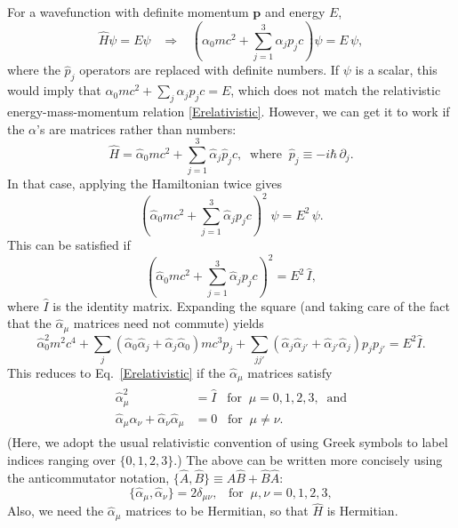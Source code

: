 \documentclass[pra,12pt]{revtex4}
\begin{document}
For a wavefunction with definite momentum $\mathbf{p}$ and energy
$E$,
\begin{equation}
  \hat{H}\psi = E \psi \;\;\;\Rightarrow \;\;\;
  \left(\alpha_0mc^2 + \sum_{j=1}^3\alpha_j p_jc\right) \psi = E\,\psi,
\end{equation}
where the $\hat{p}_j$ operators are replaced with definite numbers.
If $\psi$ is a scalar, this would imply that $\alpha_0 mc^2 +
\sum_{j}\alpha_j p_j c = E$, which does not match the relativistic
energy-mass-momentum relation \eqref{Erelativistic}.  However, we can
get it to work if the $\alpha$'s are matrices rather than numbers:
\begin{equation}
\boxed{\qquad \hat{H} = \hat{\alpha}_0 mc^2 + \sum_{j=1}^3 \hat{\alpha}_j \hat{p}_j c, \;\; \mathrm{where}\;\; \hat{p}_j \equiv -i\hbar\, \partial_j.\qquad}
\label{Dirac}
\end{equation}
In that case, applying the Hamiltonian twice gives
\begin{equation}
  \left(\hat{\alpha}_0mc^2 + \sum_{j=1}^3\hat{\alpha}_j p_j c\right)^{\!2}\;
  \psi = E^2\,\psi.
\end{equation}
This can be satisfied if
\begin{equation}
  \left(\hat{\alpha}_0 mc^2 + \sum_{j=1}^3\hat{\alpha}_j p_j c\right)^2
  = E^2\, \hat{I},
\end{equation}
where $\hat{I}$ is the identity matrix.  Expanding the square (and
taking care of the fact that the $\hat{\alpha}_\mu$ matrices need not
commute) yields
\begin{equation}
  \hat{\alpha}_0^2 m^2c^4
  + \sum_j \left(\hat{\alpha}_0 \hat{\alpha}_j + \hat{\alpha}_j \hat{\alpha}_0\right) mc^3 p_j
  + \sum_{jj'} \left(\hat{\alpha}_j \hat{\alpha}_{j'} + \hat{\alpha}_{j'} \hat{\alpha}_j\right) p_j p_{j'} = E^2\hat{I}.
\end{equation}
This reduces to Eq.~\eqref{Erelativistic} if the $\hat{\alpha}_\mu$
matrices satisfy
\begin{align}
  \begin{aligned}
    \hat{\alpha}_\mu^2 &= \hat{I} \;\;\; \textrm{for} \;\;\mu=0,1,2,3,
    \;\;\textrm{and} \\
    \hat{\alpha}_\mu \hat{\alpha}_\nu
    + \hat{\alpha}_\nu \hat{\alpha}_\mu &= 0
    \;\;\; \textrm{for} \;\;\mu \ne \nu.
  \end{aligned}
\end{align}
(Here, we adopt the usual relativistic convention of using Greek
symbols to label indices ranging over $\{0,1,2,3\}$.)  The above can
be written more concisely using the anticommutator notation,
$\{\hat{A},\hat{B}\} \equiv \hat{A}\hat{B} + \hat{B}\hat{A}$:
\begin{equation}
  \{\hat{\alpha}_\mu, \hat{\alpha}_\nu\} = 2\delta_{\mu\nu},
  \;\;\; \textrm{for} \;\;\mu,\nu=0,1,2,3,
  \label{Dirac_anticomm}
\end{equation}
Also, we need the $\hat{\alpha}_\mu$ matrices to be Hermitian, so that
$\hat{H}$ is Hermitian.
\end{document}
